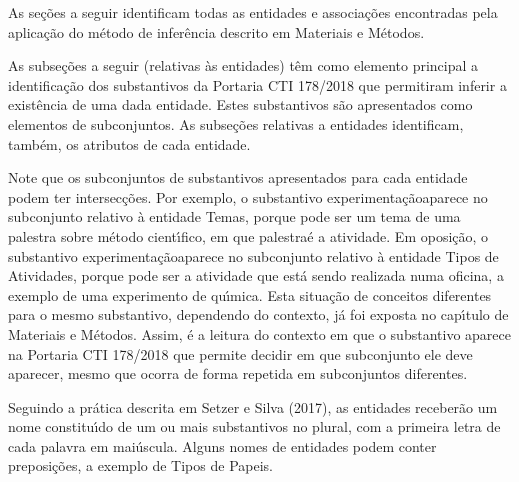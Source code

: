 \documentclass[
12pt,		%
openright,	%
twoside,  %
a4paper,			%
chapter=TITLE,		%
english,			%
french,				%
spanish,			%
brazil				%
]{USPSC-classe/USPSC}
\begin{document}
As se\c{c}\~oes a seguir identificam todas as entidades e associa\c{c}\~oes encontradas pela aplica\c{c}\~ao do m\'etodo de infer\^encia descrito em Materiais e M\'etodos.














As subse\c{c}\~oes a seguir (relativas \`as entidades) t\^em como elemento principal a identifica\c{c}\~ao dos substantivos da Portaria CTI 178/2018 que permitiram inferir a exist\^encia de uma dada entidade. Estes substantivos s\~ao apresentados como elementos de subconjuntos. As subse\c{c}\~oes relativas a entidades identificam, tamb\'em, os atributos de cada entidade.














Note que os subconjuntos de substantivos apresentados para cada entidade podem ter intersec\c{c}\~oes. Por exemplo, o substantivo \textquotedbl experimenta\c{c}\~ao\textquotedbl  aparece no subconjunto relativo \`a entidade \textquotedbl Temas\textquotedbl , porque pode ser um tema de uma palestra sobre m\'etodo cient\'{\i}fico, em que \textquotedbl palestra\textquotedbl  \'e a atividade. Em oposi\c{c}\~ao, o substantivo \textquotedbl experimenta\c{c}\~ao\textquotedbl  aparece no subconjunto relativo \`a entidade \textquotedbl Tipos de Atividades\textquotedbl , porque pode ser a atividade que est\'a sendo realizada numa oficina, a exemplo de uma experimento de qu\'{\i}mica. Esta situa\c{c}\~ao de conceitos diferentes para o mesmo substantivo, dependendo do contexto, j\'a foi exposta no cap\'{\i}tulo de Materiais e M\'etodos. Assim, \'e a leitura do contexto em que o substantivo aparece na Portaria CTI 178/2018 que permite decidir em que subconjunto ele deve aparecer, mesmo que ocorra de forma repetida em subconjuntos diferentes.














Seguindo a pr\'atica descrita em  Setzer e Silva (2017), as entidades receber\~ao um nome constitu\'{\i}do de um ou mais substantivos no plural, com a primeira letra de cada palavra em mai\'uscula. Alguns nomes de entidades podem conter preposi\c{c}\~oes, a exemplo de \textquotedbl Tipos de Papeis\textquotedbl .
\end{document}
